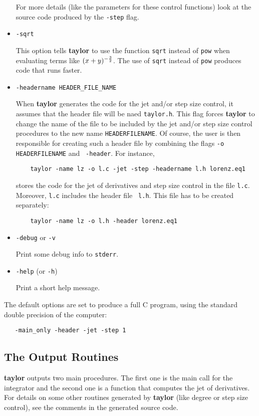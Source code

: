 \documentclass[10pt]{article}
\theoremstyle{remark}
\newcommand{\taylorname}{{\bf taylor}}
\begin{document}
\begin{itemize}
{For more details (like the parameters for these control functions)
look at the source code produced by the {\tt -step} flag.  }

\item{\verb+-sqrt+

This option tells \taylorname{} to use the function \verb+sqrt+
instead of \verb+pow+ when evaluating terms like $(x+y)^{-{3\over
    2}}$.  The use of {\tt sqrt} instead of {\tt pow} produces code
that runs faster.}

\item{\verb+-headername HEADER_FILE_NAME+

When \taylorname{} generates the code for the jet and/or step size
control, it assumes that the header file will be naed {\tt taylor.h}.
This flag forces \taylorname{} to change the name of the file to be
included by the jet and/or step size control procedures to the new
name {\tt HEADERFILENAME}. Of course, the user
is then responsible for creating such a header file by combining the
flags {\tt -o HEADERFILENAME} and {\tt
  -header}. For instance,
\begin{verbatim}
    taylor -name lz -o l.c -jet -step -headername l.h lorenz.eq1
\end{verbatim}
stores the code for the jet of derivatives and step size control in
the file {\tt l.c}. Moreover, {\tt l.c} includes the header file {\tt
  l.h}. This file has to be created separately:
\begin{verbatim}
    taylor -name lz -o l.h -header lorenz.eq1
\end{verbatim}
}

\item{\verb+-debug+ or \verb+-v+ 

Print some debug info to \verb+stderr+.}

\item{\verb+-help+ (or \verb+-h+)

Print a short help message.}

\end{itemize}

\noindent
The default options are set to produce a full C program, using the
standard double precision of the computer:
\begin{verbatim}
   -main_only -header -jet -step 1
\end{verbatim}

\subsection{The Output Routines}\label{sec:or}
\taylorname{} outputs two main procedures. The first one is the main
call for the integrator and the second one is a function that computes
the jet of derivatives. For details on some other routines generated
by \taylorname{} (like degree or step size control), see the comments
in the generated source code.
\end{document}
